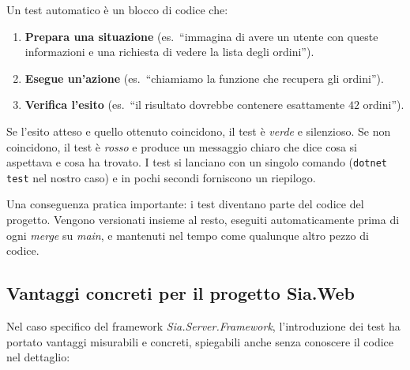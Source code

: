 Un test automatico è un blocco di codice che:
\begin{enumerate}
    \item \textbf{Prepara una situazione} (es.\ ``immagina di avere un utente con queste informazioni e una richiesta di vedere la lista degli ordini'').
    \item \textbf{Esegue un'azione} (es.\ ``chiamiamo la funzione che recupera gli ordini'').
    \item \textbf{Verifica l'esito} (es.\ ``il risultato dovrebbe contenere esattamente $42$ ordini'').
\end{enumerate}

Se l'esito atteso e quello ottenuto coincidono, il test è \emph{verde} e silenzioso. Se non coincidono, il test è \emph{rosso} e produce un messaggio chiaro che dice cosa si aspettava e cosa ha trovato. I test si lanciano con un singolo comando (\texttt{dotnet test} nel nostro caso) e in pochi secondi forniscono un riepilogo.

Una conseguenza pratica importante: i test diventano parte del codice del progetto. Vengono versionati insieme al resto, eseguiti automaticamente prima di ogni \emph{merge} su \emph{main}, e mantenuti nel tempo come qualunque altro pezzo di codice.

\subsection{Vantaggi concreti per il progetto Sia.Web}

Nel caso specifico del framework \emph{Sia.Server.Framework}, l'introduzione dei test ha portato vantaggi misurabili e concreti, spiegabili anche senza conoscere il codice nel dettaglio:

